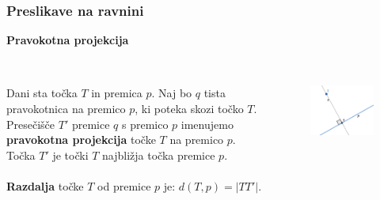         \begin{frame}
            \frametitle{Preslikave na ravnini}

            \large\textbf{Pravokotna projekcija}
            ~\\
            ~\\

            \normalsize
            \begin{columns}
                    Dani sta točka $T$ in premica $p$. Naj bo $q$ tista pravokotnica na premico $p$, ki poteka skozi točko $T$. 
                    Presečišče $T'$ premice $q$ s premico $p$ imenujemo \textbf{pravokotna projekcija} točke $T$ na premico $p$. 
                    Točka $T'$ je točki $T$ najbližja točka premice $p$. \\
                    ~\\
                    \textbf{Razdalja} točke $T$ od premice $p$ je: $d(T,p)=\left\lvert TT'\right\rvert$.
                    \begin{figure}
                    \includegraphics[scale=0.5]{Slike in skice/Pravokotna_projekcija.png}
                    \end{figure}
            \end{columns}
            
        \end{frame}

